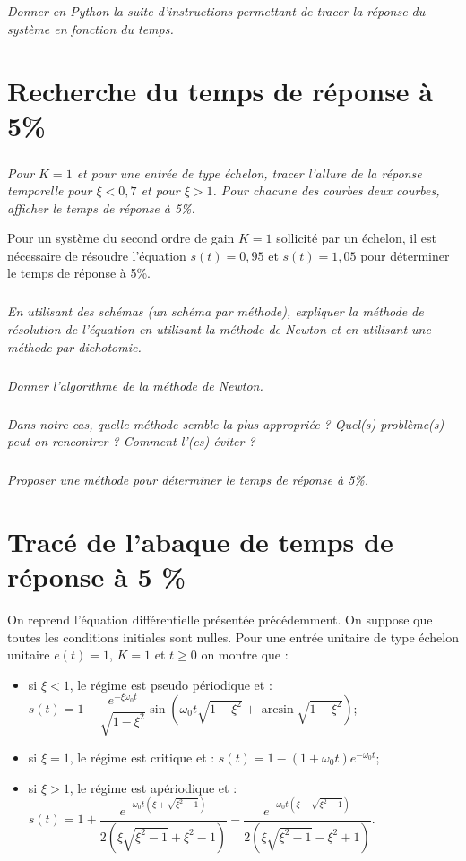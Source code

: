 \documentclass[10pt,fleqn]{article} %
\begin{document}
\subparagraph{}
\textit{Donner en Python la suite d'instructions permettant de tracer la réponse du système en fonction du temps.}

\section{Recherche du temps de réponse à 5\%}

\subparagraph{}
\textit{Pour $K=1$ et pour une entrée de type échelon, tracer l'allure de la réponse temporelle pour $\xi<0,7$ et pour $\xi>1$. Pour chacune des courbes deux courbes, afficher le temps de réponse à 5\%.}

\vspace{.5cm}

Pour un système du second ordre de gain $K=1$ sollicité par un échelon, il est nécessaire de résoudre l'équation $s(t)=0,95$ et $s(t)=1,05$ pour déterminer le temps de réponse à 5\%.

\subparagraph{}
\textit{En utilisant des schémas (un schéma par méthode), expliquer la méthode de résolution de l'équation en utilisant la méthode de Newton et en utilisant une méthode par dichotomie.}


\subparagraph{}
\textit{Donner l'algorithme de la méthode de Newton.}


\subparagraph{}
\textit{Dans notre cas, quelle méthode semble la plus appropriée ? Quel(s) problème(s) peut-on rencontrer ? Comment l'(es) éviter ? }



\subparagraph{}
\textit{Proposer une méthode pour déterminer le temps de réponse à 5\%. }


\section{Tracé de l'abaque de temps de réponse à 5 \%}


\ifprof
\else
On reprend l'équation différentielle présentée précédemment. On suppose que toutes les conditions initiales sont nulles. Pour une entrée unitaire de type échelon unitaire $e(t)=1$, $K=1$ et $t\geq0$ on montre que : 
\begin{itemize}
\item si $\xi <1$, le régime est pseudo périodique et :
$
s(t)=1-\dfrac{e^{-\xi\omega_0 t}}{\sqrt{1-\xi^2}}\sin\left(  \omega_0 t\sqrt{1-\xi^2}+\arcsin \sqrt{1-\xi^2} \right)
$;
\item si $\xi=1$, le régime est critique et : 
$
s(t)=1-\left(1+\omega_0 t \right)e^{-\omega_0 t} 
$;
\item si $\xi>1$, le régime est apériodique et : 
$
s(t)=1
+\dfrac{e^{- \omega_0 t\left( \xi + \sqrt{\xi^2-1}\right)}}{2\left(\xi\sqrt{\xi^2-1}+\xi^2-1 \right)}
-\dfrac{e^{- \omega_0 t \left( \xi - \sqrt{\xi^2-1}\right)}}{2\left(\xi\sqrt{\xi^2-1}-\xi^2+1 \right)}
$.
\end{itemize} 
\end{document}
